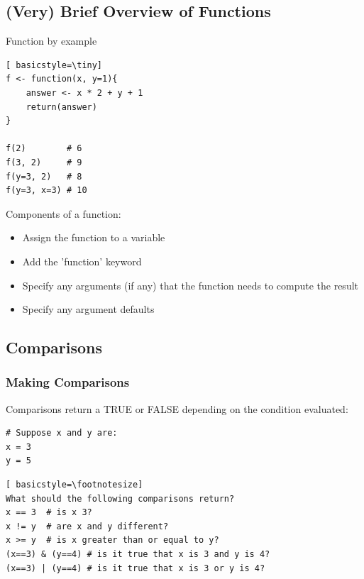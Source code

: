 \subsection{(Very) Brief Overview of Functions}
\begin{frame}[fragile]
	\begin{center}
		\begin{block}{Function by example}
			\begin{lstlisting}[ basicstyle=\tiny]
f <- function(x, y=1){
	answer <- x * 2 + y + 1
	return(answer)
}

f(2)        # 6
f(3, 2)     # 9
f(y=3, 2)   # 8
f(y=3, x=3) # 10
			\end{lstlisting}	
		\end{block}

		\begin{block}{Components of a function:}
			\begin{itemize}
				\item Assign the function to a variable
				\item Add the 'function' keyword
				\item Specify any arguments (if any) that the function needs to compute the result
				\item Specify any argument defaults
			\end{itemize}
		\end{block}
	\end{center} 
\end{frame}

\subsection{Comparisons}
\begin{frame}[fragile]
\frametitle{Making Comparisons}
Comparisons return a TRUE or FALSE depending on the condition evaluated:
			\begin{lstlisting}
# Suppose x and y are:
x = 3
y = 5
			\end{lstlisting}
			\begin{lstlisting}[ basicstyle=\footnotesize]
What should the following comparisons return?
x == 3  # is x 3?
x != y  # are x and y different?
x >= y  # is x greater than or equal to y?
(x==3) & (y==4) # is it true that x is 3 and y is 4?
(x==3) | (y==4) # is it true that x is 3 or y is 4?
			\end{lstlisting}	
\end{frame}


